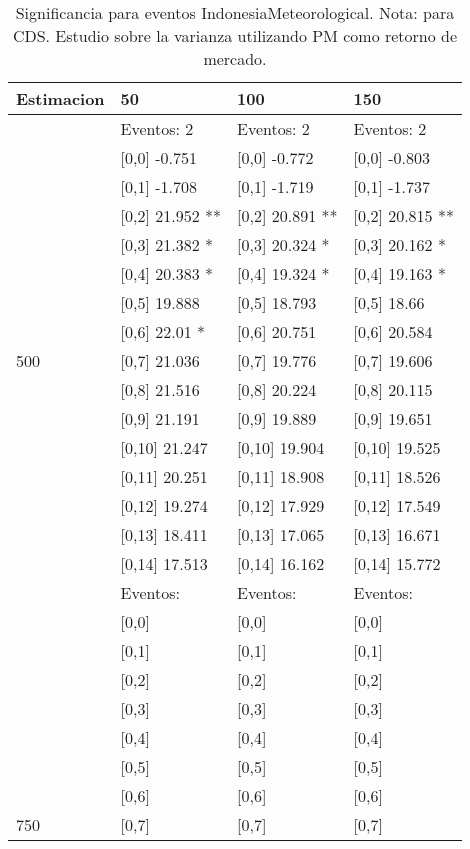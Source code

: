 \begin{table}

\caption{Significancia para eventos IndonesiaMeteorological. Nota: para CDS. Estudio sobre la varianza utilizando PM como retorno de mercado.}
\centering
\begin{tabular}[t]{llll}
\toprule
Estimacion & 50 & 100 & 150\\
\midrule
 & Eventos:  2 & Eventos:  2 & Eventos:  2\\
 & {}[0,0] -0.751 & {}[0,0] -0.772 & {}[0,0] -0.803\\
 & {}[0,1] -1.708 & {}[0,1] -1.719 & {}[0,1] -1.737\\
 & {}[0,2] 21.952 ** & {}[0,2] 20.891 ** & {}[0,2] 20.815 **\\
 & {}[0,3] 21.382 * & {}[0,3] 20.324 * & {}[0,3] 20.162 *\\
\addlinespace
 & {}[0,4] 20.383 * & {}[0,4] 19.324 * & {}[0,4] 19.163 *\\
 & {}[0,5] 19.888 & {}[0,5] 18.793 & {}[0,5] 18.66\\
 & {}[0,6] 22.01 * & {}[0,6] 20.751 & {}[0,6] 20.584\\
500 & {}[0,7] 21.036 & {}[0,7] 19.776 & {}[0,7] 19.606\\
 & {}[0,8] 21.516 & {}[0,8] 20.224 & {}[0,8] 20.115\\
\addlinespace
 & {}[0,9] 21.191 & {}[0,9] 19.889 & {}[0,9] 19.651\\
 & {}[0,10] 21.247 & {}[0,10] 19.904 & {}[0,10] 19.525\\
 & {}[0,11] 20.251 & {}[0,11] 18.908 & {}[0,11] 18.526\\
 & {}[0,12] 19.274 & {}[0,12] 17.929 & {}[0,12] 17.549\\
 & {}[0,13] 18.411 & {}[0,13] 17.065 & {}[0,13] 16.671\\
\addlinespace
 & {}[0,14] 17.513 & {}[0,14] 16.162 & {}[0,14] 15.772\\
 & Eventos: & Eventos: & Eventos:\\
 & {}[0,0] & {}[0,0] & {}[0,0]\\
 & {}[0,1] & {}[0,1] & {}[0,1]\\
 & {}[0,2] & {}[0,2] & {}[0,2]\\
\addlinespace
 & {}[0,3] & {}[0,3] & {}[0,3]\\
 & {}[0,4] & {}[0,4] & {}[0,4]\\
 & {}[0,5] & {}[0,5] & {}[0,5]\\
 & {}[0,6] & {}[0,6] & {}[0,6]\\
750 & {}[0,7] & {}[0,7] & {}[0,7]\\

\end{tabular}
\end{table}
